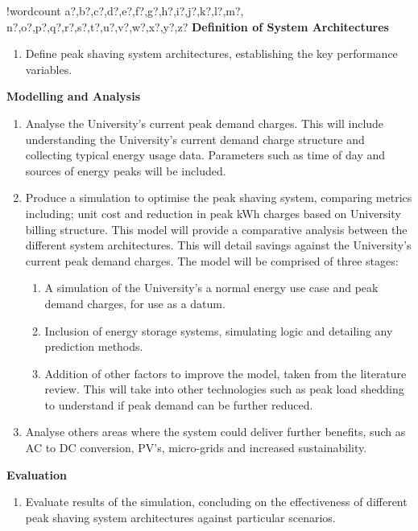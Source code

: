 \documentclass[10pt]{article}
\newcounter{words}
\newenvironment{counted}{%
  \setcounter{words}{0}
  \SearchList!{wordcount}{\stepcounter{words}}
    {a?,b?,c?,d?,e?,f?,g?,h?,i?,j?,k?,l?,m?,
    n?,o?,p?,q?,r?,s?,t?,u?,v?,w?,x?,y?,z?}
  \UndoBoundary{'}
  \SearchOrder{p;}}{%
  \StopSearching}
\begin{document}
\begin{counted}
\textbf{Definition of System Architectures}

\begin{enumerate}[resume]
\item Define peak shaving system architectures, establishing the key performance variables.
\end{enumerate}

\textbf{Modelling and Analysis}

\begin{enumerate}[resume]
\item Analyse the University’s current peak demand charges. This will include understanding the University’s current demand charge structure and collecting typical energy usage data. Parameters such as time of day and sources of energy peaks will be included.
\item Produce a simulation to optimise the peak shaving system, comparing metrics including; unit cost and reduction in peak kWh charges based on University billing structure. This model will provide a comparative analysis between the different system architectures. This will detail savings against the University’s current peak demand charges. The model will be comprised of three stages:
\begin{enumerate}
\item A simulation of the University's a normal energy use case and peak demand charges, for use as a datum.
\item Inclusion of energy storage systems, simulating logic and detailing any prediction methods.
\item Addition of other factors to improve the model, taken from the literature review. This will take into other technologies such as peak load shedding to understand if peak demand can be further reduced.
\end{enumerate}
\item Analyse others areas where the system could deliver further benefits, such as AC to DC conversion, PV’s, micro-grids and increased sustainability.
\end{enumerate}

\textbf{Evaluation}

\begin{enumerate}[resume]
\item Evaluate results of the simulation, concluding on the effectiveness of different peak shaving system architectures against particular scenarios.
\end{enumerate}


\end{counted}
\end{document}
